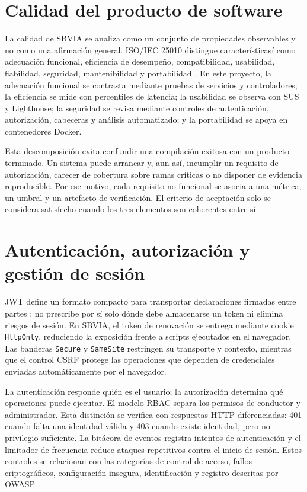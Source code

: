\documentclass[11pt,a4paper]{report}
\begin{document}
\section{Calidad del producto de software}
La calidad de SBVIA se analiza como un conjunto de propiedades observables y no como una afirmación general. ISO/IEC 25010 distingue característicasí como adecuación funcional, eficiencia de desempeño, compatibilidad, usabilidad, fiabilidad, seguridad, mantenibilidad y portabilidad \cite{iso25010}. En este proyecto, la adecuación funcional se contrasta mediante pruebas de servicios y controladores; la eficiencia se mide con percentiles de latencia; la usabilidad se observa con SUS y Lighthouse; la seguridad se revisa mediante controles de autenticación, autorización, cabeceras y análisis automatizado; y la portabilidad se apoya en contenedores Docker.

Esta descomposición evita confundir una compilación exitosa con un producto terminado. Un sistema puede arrancar y, aun así, incumplir un requisito de autorización, carecer de cobertura sobre ramas críticas o no disponer de evidencia reproducible. Por ese motivo, cada requisito no funcional se asocia a una métrica, un umbral y un artefacto de verificación. El criterio de aceptación solo se considera satisfecho cuando los tres elementos son coherentes entre sí.

\section{Autenticación, autorización y gestión de sesión}
JWT define un formato compacto para transportar declaraciones firmadas entre partes \cite{rfc7519}; no prescribe por sí solo dónde debe almacenarse un token ni elimina riesgos de sesión. En SBVIA, el token de renovación se entrega mediante cookie \texttt{HttpOnly}, reduciendo la exposición frente a scripts ejecutados en el navegador. Las banderas \texttt{Secure} y \texttt{SameSite} restringen su transporte y contexto, mientras que el control CSRF protege las operaciones que dependen de credenciales enviadas automáticamente por el navegador.

La autenticación responde quién es el usuario; la autorización determina qué operaciones puede ejecutar. El modelo RBAC separa los permisos de conductor y administrador. Esta distinción se verifica con respuestas HTTP diferenciadas: 401 cuando falta una identidad válida y 403 cuando existe identidad, pero no privilegio suficiente. La bitácora de eventos registra intentos de autenticación y el limitador de frecuencia reduce ataques repetitivos contra el inicio de sesión. Estos controles se relacionan con las categorías de control de acceso, fallos criptográficos, configuración insegura, identificación y registro descritas por OWASP \cite{owasp2021}.
\end{document}
